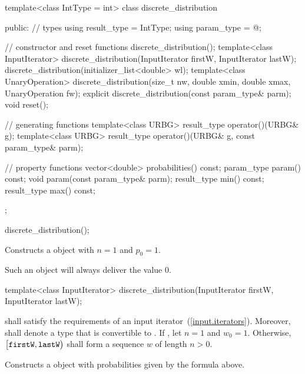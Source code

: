 %
\begin{codeblock}
template<class IntType = int>
  class discrete_distribution {
  public:
    // types
    using result_type = IntType;
    using param_type  = @\unspec@;

    // constructor and reset functions
    discrete_distribution();
    template<class InputIterator>
      discrete_distribution(InputIterator firstW, InputIterator lastW);
    discrete_distribution(initializer_list<double> wl);
    template<class UnaryOperation>
      discrete_distribution(size_t nw, double xmin, double xmax, UnaryOperation fw);
    explicit discrete_distribution(const param_type& parm);
    void reset();

    // generating functions
    template<class URBG>
      result_type operator()(URBG& g);
    template<class URBG>
      result_type operator()(URBG& g, const param_type& parm);

    // property functions
    vector<double> probabilities() const;
    param_type param() const;
    void param(const param_type& parm);
    result_type min() const;
    result_type max() const;
  };
\end{codeblock}

\begin{itemdecl}
discrete_distribution();
\end{itemdecl}

\begin{itemdescr}
\pnum\effects Constructs a  object
 with $ n = 1 $
 and $ p_0 = 1 $.
 \begin{note}
   Such an object will always deliver the value $0$.
 \end{note}
\end{itemdescr}


%
\begin{itemdecl}
template<class InputIterator>
  discrete_distribution(InputIterator firstW, InputIterator lastW);
\end{itemdecl}

\begin{itemdescr}
\pnum\requires
   shall satisfy the requirements
  of an input iterator~(\ref{input.iterators}).
  Moreover,
  shall denote a type that is convertible to .
 If ,
 let $ n = 1 $
 and $ w_0 = 1 $.
 Otherwise,
 $\bigl[\texttt{\protect firstW}, \texttt{\protect lastW}\bigr)$
 shall form a sequence $w$ of length $n > 0$.

\pnum\effects Constructs a  object
 with probabilities given by the formula above.
\end{itemdescr}


